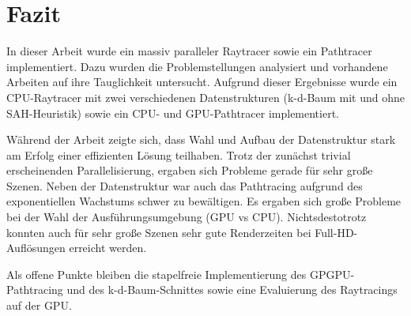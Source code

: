 \newpage
\chapter{Fazit}
\label{ch:fazit}

In dieser Arbeit wurde ein massiv paralleler Raytracer sowie ein Pathtracer implementiert. Dazu wurden die Problemstellungen analysiert und vorhandene Arbeiten auf ihre Tauglichkeit untersucht. Aufgrund dieser Ergebnisse wurde ein CPU-Raytracer mit zwei verschiedenen Datenstrukturen (k-d-Baum mit und ohne SAH-Heuristik) sowie ein CPU- und GPU-Pathtracer implementiert. 

Während der Arbeit zeigte sich, dass Wahl und Aufbau der Datenstruktur stark am Erfolg einer effizienten Lösung teilhaben. Trotz der zunächst trivial erscheinenden Parallelisierung, ergaben sich Probleme gerade für sehr große Szenen. Neben der Datenstruktur war auch das Pathtracing aufgrund des exponentiellen Wachstums schwer zu bewältigen. Es ergaben sich große Probleme bei der Wahl der Ausführungsumgebung (GPU vs CPU). Nichtsdestotrotz konnten auch für sehr große Szenen sehr gute Renderzeiten bei Full-HD-Auflösungen erreicht werden.

Als offene Punkte bleiben die stapelfreie Implementierung des GPGPU-Pathtracing und des k-d-Baum-Schnittes sowie eine Evaluierung des Raytracings auf der GPU.